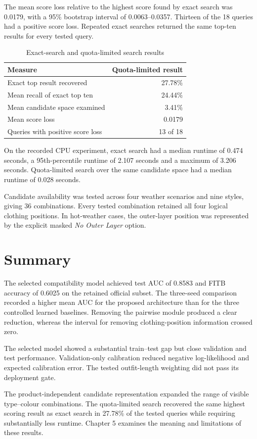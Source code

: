The mean score loss relative to the highest score found by exact search was
0.0179, with a 95\% bootstrap interval of 0.0063--0.0357. Thirteen of the 18
queries had a positive score loss. Repeated exact searches returned the same
top-ten results for every tested query.

\begin{table}[htbp]
  \centering
  \caption{Exact-search and quota-limited search results}
  \label{tab:search-results}
  \begin{tabular}{lr}
    \toprule
    Measure & Quota-limited result \\
    \midrule
    Exact top result recovered & 27.78\% \\
    Mean recall of exact top ten & 24.44\% \\
    Mean candidate space examined & 3.41\% \\
    Mean score loss & 0.0179 \\
    Queries with positive score loss & 13 of 18 \\
    \bottomrule
  \end{tabular}
\end{table}

On the recorded CPU experiment, exact search had a median runtime of 0.474
seconds, a 95th-percentile runtime of 2.107 seconds and a maximum of 3.206
seconds. Quota-limited search over the same candidate space had a median runtime
of 0.028 seconds.

Candidate availability was tested across four weather scenarios and nine
styles, giving 36 combinations. Every tested combination retained all four
logical clothing positions. In hot-weather cases, the outer-layer position was
represented by the explicit masked \emph{No Outer Layer} option.

\section{Summary}

The selected compatibility model achieved test AUC of 0.8583 and FITB accuracy
of 0.6025 on the retained official subset. The three-seed comparison recorded a
higher mean AUC for the proposed architecture than for the three controlled
learned baselines. Removing the pairwise module produced a clear reduction,
whereas the interval for removing clothing-position information crossed zero.

The selected model showed a substantial train--test gap but close validation
and test performance. Validation-only calibration reduced negative
log-likelihood and expected calibration error. The tested outfit-length
weighting did not pass its deployment gate.

The product-independent candidate representation expanded the range of visible
type--colour combinations. The quota-limited search recovered the same highest
scoring result as exact search in 27.78\% of the tested queries while requiring
substantially less runtime. Chapter 5 examines the meaning and limitations of
these results.
